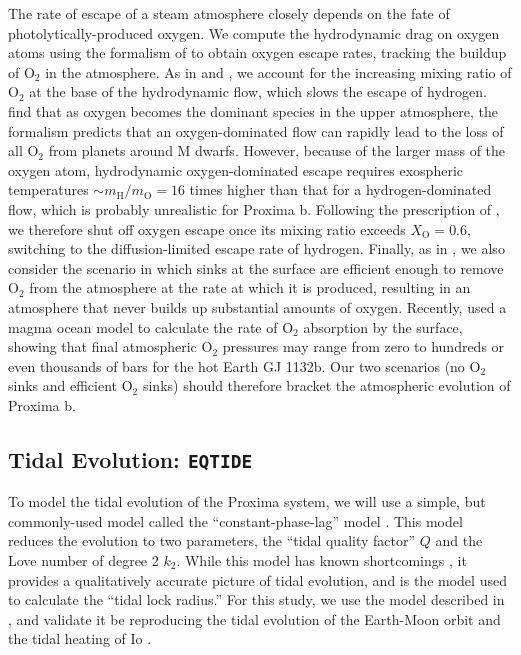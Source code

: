 \documentclass[preprint,12pt]{aastex}
\def\eqtide{\texttt{\footnotesize{EQTIDE}}\xspace}
\begin{document}
The rate of escape of a steam atmosphere closely depends on the fate
of photolytically-produced oxygen. We compute the hydrodynamic drag on
oxygen atoms using the formalism of \cite{Hunten87} to obtain oxygen
escape rates, tracking the buildup of O$_2$ in the atmosphere. As in
\cite{Tian15} and \cite{Schaefer16}, we account for the increasing
mixing ratio of O$_2$ at the base of the hydrodynamic flow, which
slows the escape of hydrogen. \cite{Tian15} find that as oxygen
becomes the dominant species in the upper atmosphere, the
\cite{Hunten87} formalism predicts that an oxygen-dominated flow can
rapidly lead to the loss of all O$_2$ from planets around M
dwarfs. However, because of the larger mass of the oxygen atom,
hydrodynamic oxygen-dominated escape requires exospheric temperatures
$\sim m_\mathrm{H}/m_\mathrm{O} = 16$ times higher than that for a
hydrogen-dominated flow, which is probably unrealistic for Proxima
b. Following the prescription of \cite{Schaefer16}, we therefore
shut off oxygen escape once its mixing ratio exceeds $X_\mathrm{O} =
0.6$, switching to the diffusion-limited escape rate of
hydrogen. Finally, as in \cite{LugerBarnes15}, we also consider the
scenario in which sinks at the surface are efficient enough to remove
O$_2$ from the atmosphere at the rate at which it is produced,
resulting in an atmosphere that never builds up substantial amounts of
oxygen. Recently, \cite{Schaefer16} used a magma ocean model to
calculate the rate of O$_2$ absorption by the surface, showing that
final atmospheric O$_2$ pressures may range from zero to hundreds or
even thousands of bars for the hot Earth GJ 1132b. Our two scenarios
(no O$_2$ sinks and efficient O$_2$ sinks) should therefore bracket
the atmospheric evolution of Proxima b.

\subsection{Tidal Evolution: \eqtide}
\label{sec:models:eqtide}
To model the tidal evolution of the Proxima system, we will use a
simple, but commonly-used model called the ``constant-phase-lag''
model \citep{Goldreich66,Greenberg09,Heller11}. This model reduces the
evolution to two parameters, the ``tidal quality factor'' $Q$ and the
Love number of degree 2 $k_2$. While this model has known shortcomings
\citep{ToumaWisdom94,EfroimskyMakarov13}, it provides a qualitatively
accurate picture of tidal evolution, and is the model \cite{Kasting93}
used to calculate the ``tidal lock radius.'' For this study, we use
the model described in \cite{Heller11}, and validate it be reproducing
the tidal evolution of the Earth-Moon orbit \citep{MacDonald64} and
the tidal heating of Io \citep{Peale79}.
\end{document}
